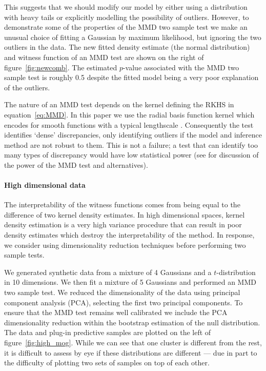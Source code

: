 \documentclass{article} %
\begin{document}
This suggests that we should modify our model by either using a distribution with heavy tails or explicitly modelling the possibility of outliers.
However, to demonstrate some of the properties of the MMD two sample test we make an unusual choice of fitting a Gaussian by maximum likelihood, but ignoring the two outliers in the data.
The new fitted density estimate (the normal distribution) and witness function of an MMD test are shown on the right of figure~\ref{fig:newcomb}.
The estimated $p$-value associated with the MMD two sample test is roughly 0.5 despite the fitted model being a very poor explanation of the outliers.

The nature of an MMD test depends on the kernel defining the RKHS in equation~\eqref{eq:MMD}.
In this paper we use the radial basis function kernel which encodes for smooth functions with a typical lengthscale \citep[e.g.][]{Rasmussen2006-ml}.
Consequently the test identifies `dense' discrepancies, only identifying outliers if the model and inference method are not robust to them.
This is not a failure; a test that can identify too many types of discrepancy would have low statistical power (see \citep{Gretton2008-gs} for discussion of the power of the MMD test and alternatives).

\paragraph{High dimensional data}

\label{sec:high_dim}

The interpretability of the witness functions comes from being equal to the difference of two kernel density estimates.
In high dimensional spaces, kernel density estimation is a very high variance procedure that can result in poor density estimates which destroy the interpretability of the method.
In response, we consider using dimensionality reduction techniques before performing two sample tests.

We generated synthetic data from a mixture of 4 Gaussians and a $t$-distribution in 10 dimensions\footnotemark.
We then fit a mixture of 5 Gaussians and performed an MMD two sample test.
We reduced the dimensionality of the data using principal component analysis (PCA), selecting the first two principal components.
To ensure that the MMD test remains well calibrated we include the PCA dimensionality reduction within the bootstrap estimation of the null distribution.
The data and plug-in predictive samples are plotted on the left of figure~\ref{fig:high_mog}.
While we can see that one cluster is different from the rest, it is difficult to assess by eye if these distributions are different --- due in part to the difficulty of plotting two sets of samples on top of each other.
\end{document}
